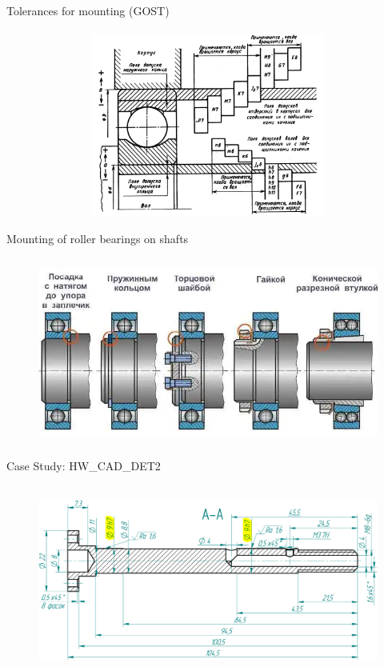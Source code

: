 \documentclass[aspectratio=169]{beamer}
\begin{document}
\begin{frame}[t]{Tolerances for mounting (GOST)}
\framesubtitle{}
    \vspace{-0.6cm}
    \begin{figure}[H]
        \centering\includegraphics[height=6cm,width=1\textwidth,keepaspectratio]{dopusk.jpg}
        \label{fig:dopusk.jpg}
    \end{figure}
\end{frame}

\begin{frame}[t]{Mounting of roller bearings on shafts}
\framesubtitle{}
    \vspace{-0.6cm}
    \begin{figure}[H]
        \centering\includegraphics[height=6cm,width=1\textwidth,keepaspectratio]{mountingbearingonshaft.png}
        \label{fig:mountingbearingonshaft.png}
    \end{figure}
\end{frame}

\begin{frame}[t]{Case Study: HW\_CAD\_DET2}
\framesubtitle{}
    \vspace{-0.6cm}
    \begin{figure}[H]
        \centering\includegraphics[height=6cm,width=1\textwidth,keepaspectratio]{shaft_hw.png}
        \label{fig:shaft_hw.png}
    \end{figure}
\end{frame}
\end{document}
